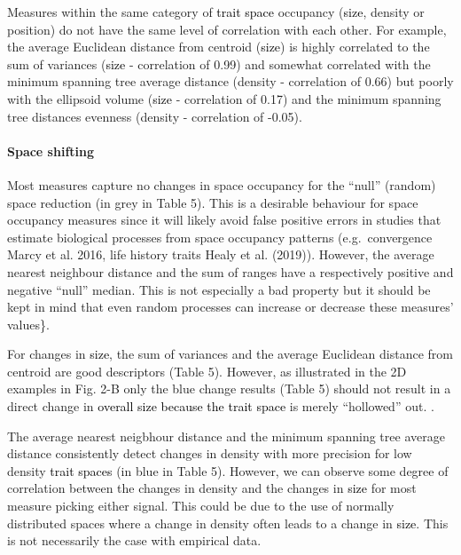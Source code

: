 \documentclass[]{article}
\let\oldparagraph\paragraph
\renewcommand{\paragraph}[1]{\oldparagraph{#1}\mbox{}}
\begin{document}
Measures within the same category of
\textcolor{black}{trait space} occupancy
(\textcolor{black}{size}, density or position) do not have
the same level of correlation with each other. For example, the average
Euclidean distance from centroid (\textcolor{black}{size}) is
highly correlated to the sum of variances
(\textcolor{black}{size} - correlation of 0.99) and somewhat
correlated with the minimum spanning tree average distance (density -
correlation of 0.66) but poorly with the ellipsoid volume
(\textcolor{black}{size} - correlation of 0.17) and the
minimum spanning tree distances evenness (density - correlation of
-0.05).

\paragraph{Space shifting}\label{caveats}

Most measures capture no changes in space occupancy for the ``null''
(random) space reduction (in grey in Table 5). This is a desirable
behaviour for space occupancy measures since it will likely avoid false
positive errors in studies that estimate biological processes from space
occupancy patterns (e.g.~convergence Marcy et al. 2016, life history
traits Healy et al. (2019)). However, the average nearest neighbour
distance and the sum of ranges have a respectively positive and negative
``null'' median. This is not especially a bad property but it should be
kept in mind that even random processes can increase or decrease these
measures' values\}.

For changes in \textcolor{black}{size}, the sum of variances
and the average Euclidean distance from centroid are good descriptors
(Table 5). However, as illustrated in the 2D examples in Fig. 2-B only
the blue change results (Table 5) should not result in a direct change
in \textcolor{black}{overall size because the trait space} is
merely ``hollowed'' out. .

The average nearest neigbhour distance and the minimum spanning tree
average distance consistently detect changes in density with more
precision for low density \textcolor{black}{trait spaces} (in
blue in Table 5). However, we can observe some degree of correlation
between the changes in density and the changes in
\textcolor{black}{size} for most measure picking either
signal. This could be due to the use of normally distributed spaces
where a change in density often leads to a change in
\textcolor{black}{size}. This is not necessarily the case
with empirical data.
\end{document}
